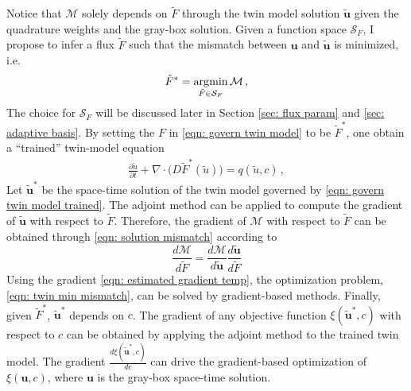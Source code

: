 Notice that $\mathcal{M}$ solely depends on
$\tilde{F}$ through the twin model solution $\tilde{\boldsymbol{u}}$ given the 
quadrature weights and the gray-box solution.
Given a function space $\mathcal{S}_F$,
I propose to infer a flux $\tilde{F}$ such that the mismatch between
$\boldsymbol{u}$ and $\tilde{\boldsymbol{u}}$ is minimized, i.e.
\begin{equation}
    \tilde{F}^* = \operatorname*{\arg\!\min}_{\tilde{F} \in \mathcal{S}_F} \mathcal{M}\,,
    \label{eqn: twin min mismatch}
\end{equation}
The choice for $\mathcal{S}_F$ will be discussed later in Section \ref{sec: flux param} and
\ref{sec: adaptive basis}. By setting the $F$ in \eqref{eqn: govern twin model} to be $\tilde{F}^*$,
one obtain a ``trained'' twin-model equation
\begin{equation}\begin{split}
    \frac{\partial \tilde{u}}{\partial t}+ \nabla \cdot \big(D \tilde{F}^*(\tilde{u})\big) = q(\tilde{u},c)\,,
\end{split}
\label{eqn: govern twin model trained}
\end{equation}
Let $\tilde{\boldsymbol{u}}^*$ be the space-time solution of the twin model governed by \eqref{eqn: govern twin model trained}.
The adjoint method can be applied to compute the gradient of $\tilde{\boldsymbol{u}}$ with respect
to $\tilde{F}$. Therefore, the gradient of $\mathcal{M}$ with respect to $\tilde{F}$ can be obtained through 
\eqref{eqn: solution mismatch} according to
\begin{equation}
    \frac{d\mathcal{M}}{d\tilde{F}} = \frac{d\mathcal{M}}{d\tilde{\boldsymbol{u}}} \frac{d\tilde{\boldsymbol{u}}}{d\tilde{F}}
    \label{eqn: estimated gradient temp}
\end{equation}
Using the gradient \eqref{eqn: estimated gradient temp}, the optimization problem, \eqref{eqn: twin min mismatch},
can be solved by gradient-based methods.
Finally, given $\tilde{F}^*$, $\tilde{\boldsymbol{u}}^*$ depends on $c$. 
The gradient of any objective function $\xi(\tilde{\boldsymbol{u}}^*, c)$ with respect to $c$
can be obtained by applying the adjoint method to the trained twin model.
The gradient $\frac{d \xi(\tilde{\boldsymbol{u}}^*, c)}{dc}$ can drive the gradient-based optimization of 
$\xi({\boldsymbol{u}}, c)$, where ${\boldsymbol{u}}$ is the gray-box space-time solution.\\


